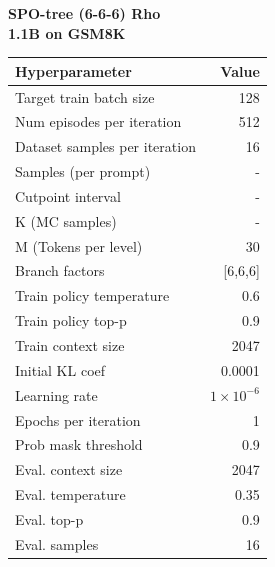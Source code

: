 \begin{minipage}[t]{0.48\textwidth}
    \centering
    \textbf{SPO-tree (6-6-6) Rho \\ 1.1B on GSM8K}\\[4pt]
    \begin{tabular}{@{}lr@{}}
        \toprule
        Hyperparameter & Value \\ \midrule
        Target train batch size & 128 \\ 
        Num episodes per iteration & 512 \\ 
        Dataset samples per iteration & 16 \\
        Samples (per prompt) & - \\
        Cutpoint interval & - \\
        K (MC samples) & - \\
        M (Tokens per level) & 30 \\
        Branch factors & [6,6,6] \\
        Train policy temperature & 0.6 \\
        Train policy top-p & 0.9 \\
        Train context size & 2047 \\
        Initial KL coef & 0.0001 \\
        Learning rate & $1\times10^{-6}$ \\
        Epochs per iteration & 1 \\
        Prob mask threshold & 0.9 \\
        Eval. context size & 2047\\
        Eval. temperature & 0.35 \\
        Eval. top-p & 0.9 \\
        Eval. samples & 16 \\
        \bottomrule
    \end{tabular}
\end{minipage}\\[15pt]



